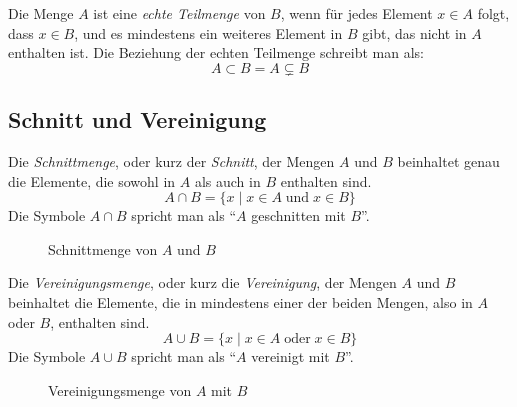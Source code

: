 \begin{defi}
 Die Menge \(A\) ist eine \emph{echte Teilmenge} von \(B\), wenn für jedes Element \(x\in A\) folgt, dass \(x\in B\), und es mindestens ein weiteres Element in \(B\) gibt, das nicht in \(A\) enthalten ist. Die Beziehung der echten Teilmenge schreibt man als:
 \begin{equation*}
  A\subset B = A \subsetneq B
 \end{equation*}
\end{defi}

\subsection{Schnitt und Vereinigung}

\begin{defi}[Schnittmenge]
 Die \emph{Schnittmenge}, oder kurz der \emph{Schnitt}, der Mengen \(A\) und \(B\) beinhaltet genau die Elemente, die sowohl in \(A\) als auch in \(B\) enthalten sind.
 \begin{equation*}
  A\cap B = \lbrace x\mid x\in A \;\text{und}\; x\in B\rbrace
 \end{equation*}
 Die Symbole \(A \cap B\) spricht man als "`\(A\) geschnitten mit \(B\)"'.
\begin{figure}
  \begin{center}
  \end{center}
  \caption{Schnittmenge von \(A\) und \(B\)}
 \end{figure}
\end{defi}

\begin{defi}[Vereinigungsmenge]
 Die \emph{Vereinigungsmenge}, oder kurz die \emph{Vereinigung}, der Mengen \(A\) und \(B\) beinhaltet die Elemente, die in mindestens einer der beiden Mengen, also in \(A\) oder \(B\), enthalten sind.
 \begin{equation*}
  A\cup B = \lbrace x\mid x\in A \;\text{oder}\; x\in B\rbrace
 \end{equation*}
 Die Symbole \(A \cup B\) spricht man als "`\(A\) vereinigt mit \(B\)"'.
 \begin{figure}
  \begin{center}
  \end{center}
  \caption{Vereinigungsmenge von \(A\) mit \(B\)}
 \end{figure}
\end{defi}

